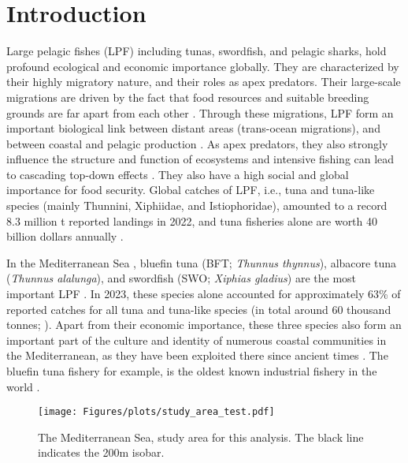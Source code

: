 \chapter{Introduction}
Large pelagic fishes (LPF) including tunas, swordfish, and pelagic sharks, hold profound ecological
and economic importance globally. They are characterized by their highly migratory nature, and
their roles as apex predators. Their large-scale migrations are driven by the fact that food
resources and suitable breeding grounds are far apart from each other
\citep{fromentin_2005_tunareview,swordfish_migration,migration_lpf}. Through these migrations, LPF
form an important biological link between distant areas (trans-ocean migrations), and between
coastal and pelagic production \citep{linking_study}. As apex predators, they also strongly
influence the structure and function of ecosystems and intensive fishing can lead to cascading
top-down effects \citep{baum_worm_cascading,young15}. They also have a high social and global
importance for food security. Global catches of LPF, i.e., tuna and tuna-like species (mainly
Thunnini, Xiphiidae, and Istiophoridae), amounted to a record 8.3 million t reported landings in
2022, and tuna fisheries alone are worth 40 billion dollars annually
\citep{FAO2024,pew_tuna_value}.

\medskip

In the Mediterranean Sea , bluefin tuna (BFT; \textit{Thunnus thynnus}),
albacore tuna (\textit{Thunnus alalunga}), and swordfish (SWO; \textit{Xiphias gladius}) are the
most important LPF \citep{fisheries_med_2000}. In 2023, these species alone accounted for
approximately 63\% of reported catches for all tuna and tuna-like species (in total around 60
thousand tonnes; \citealp{iccat_catches}). Apart from their economic importance, these three
species also form an important part of the culture and identity of numerous coastal communities in
the Mediterranean, as they have been exploited there since ancient times
\citep{cultural_social_addis,usai_22_culture,natale2005,andrews_ancient}. The bluefin tuna fishery
for example, is the oldest known industrial fishery in the world \citep{natale2012}.

\medskip

\begin{figure}[H]
	\texttt{[image: Figures/plots/study\_area\_test.pdf]}
	\caption{The Mediterranean Sea, study area for this analysis. The black line indicates the 200m isobar.}
	\label{fig:study_area}
\end{figure}

